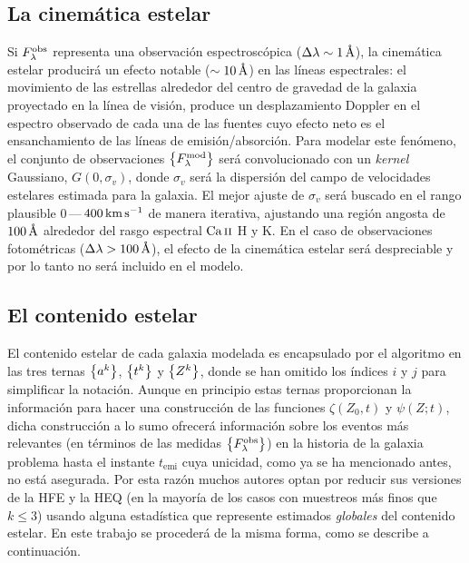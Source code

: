 \subsection{La cinemática estelar}

Si $\sedt[F]{obs}$ representa una observación espectroscópica ($\Delta\lambda\sim\unit[1]{\AA}$), la
cinemática estelar producirá un efecto notable ($\sim\unit[10]{\AA}$) en las líneas espectrales: el
movimiento de las estrellas alrededor del centro de gravedad de la galaxia proyectado en la línea de
visión, produce un desplazamiento Doppler en el espectro observado de cada una de las fuentes cuyo
efecto neto es el ensanchamiento de las líneas de emisión/absorción. Para modelar este fenómeno, el
conjunto de observaciones $\set{\sedt[F]{mod}}$ será convolucionado con un \emph{kernel} Gaussiano,
$G(0,\sigma_v)$, donde $\sigma_v$ será la dispersión del campo de velocidades estelares estimada
para la galaxia. El mejor ajuste de $\sigma_v$ será buscado en el rango plausible
$0\,$---$\,\unit[400]{km\,s\up{-1}}$ de manera iterativa, ajustando una región angosta de
$\unit[100]{\AA}$ alrededor del rasgo espectral $\Caii$ H y K. En el caso de observaciones
fotométricas ($\Delta\lambda>\unit[100]{\AA}$), el efecto de la cinemática estelar será despreciable
y por lo tanto no será incluido en el modelo.

\subsection{El contenido estelar}

El contenido estelar de cada galaxia modelada es encapsulado por el algoritmo \dynbas en las tres
ternas $\set{a^k}$, $\set{t^k}$ y $\set{Z^k}$, donde se han omitido los índices $i$ y $j$ para
simplificar la notación. Aunque en principio estas ternas proporcionan la información para hacer una
construcción de las funciones $\zeta(Z_0,t)$ y $\psi(Z;t)$, dicha construcción a lo sumo ofrecerá
información sobre los eventos más relevantes (en términos de las medidas $\set{\sedt[F]{obs}}$) en
la historia de la galaxia problema hasta el instante $t_\text{emi}$ cuya unicidad, como ya se ha
mencionado antes, no está asegurada. Por esta razón muchos autores \citep[\eg,][]{Heavens2000,
Brinchmann2004, Gallazzi2005, Lee2009, CidFernandes2013, Magris2015} optan por reducir sus versiones
de la HFE y la HEQ (en la mayoría de los casos con muestreos más finos que $k\leq3$) usando alguna
estadística que represente estimados \emph{globales} del contenido estelar. En este trabajo se
procederá de la misma forma, como se describe a continuación.

